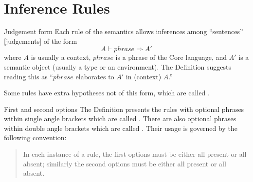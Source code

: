 \section{Inference Rules}\label{section:static-core:inference-rules}

\begin{clause}{Judgement form}
Each rule of the semantics allows inferences among ``sentences''
[judgements] of the form
\begin{equation*}
A\vdash phrase\Rightarrow A'
\end{equation*}
where $A$ is usually a context, $phrase$ is a phrase of the Core
language, and $A'$ is a semantic object (usually a type or an
environment). The Definition suggests reading this as ``$phrase$
elaborates to $A'$ in (context) $A$.''

Some rules have extra hypotheses not of this form, which are called
.
\end{clause}

\begin{convention}{First and second options}
The Definition presents the rules with optional phrases within single
angle brackets \optional{\ } which are called .
There are also optional phrases within double angle brackets
\optional{\optional{\ }} which are called . Their
usage is governed by the following convention:
\begin{quote}
In each instance of a rule, the first options must be either all present
or all absent; similarly the second options must be either all present
or all absent.
\end{quote}
\end{convention}

